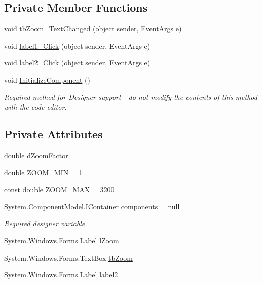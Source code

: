 \subsection*{Private Member Functions}
\begin{DoxyCompactItemize}
\item 
void \mbox{\hyperlink{class_paint___program_1_1_zoom_control_a1ee526663282fdc5eef952188eba387b}{tb\+Zoom\+\_\+\+Text\+Changed}} (object sender, Event\+Args e)
\item 
void \mbox{\hyperlink{class_paint___program_1_1_zoom_control_a6d2fce455e1f5e4274e5298c3157de5d}{label1\+\_\+\+Click}} (object sender, Event\+Args e)
\item 
void \mbox{\hyperlink{class_paint___program_1_1_zoom_control_a8269532cbb9e59c04a61561c4ae1ebe3}{label2\+\_\+\+Click}} (object sender, Event\+Args e)
\item 
void \mbox{\hyperlink{class_paint___program_1_1_zoom_control_ae61acf927bdaa41820d5ee2c8b5c05c4}{Initialize\+Component}} ()
\begin{DoxyCompactList}\small\item\em Required method for Designer support -\/ do not modify the contents of this method with the code editor. \end{DoxyCompactList}\end{DoxyCompactItemize}
\subsection*{Private Attributes}
\begin{DoxyCompactItemize}
\item 
double \mbox{\hyperlink{class_paint___program_1_1_zoom_control_a929f4269dd2e850603888768d8f83753}{d\+Zoom\+Factor}}
\item 
double \mbox{\hyperlink{class_paint___program_1_1_zoom_control_a615b9941df411c331af5041d38da6ad2}{Z\+O\+O\+M\+\_\+\+M\+IN}} = 1
\item 
const double \mbox{\hyperlink{class_paint___program_1_1_zoom_control_a81f7435ed0a733d8c3fd4d86f5c8e6b2}{Z\+O\+O\+M\+\_\+\+M\+AX}} = 3200
\item 
System.\+Component\+Model.\+I\+Container \mbox{\hyperlink{class_paint___program_1_1_zoom_control_a0c11233497665c39609e490beca6eaf2}{components}} = null
\begin{DoxyCompactList}\small\item\em Required designer variable. \end{DoxyCompactList}\item 
System.\+Windows.\+Forms.\+Label \mbox{\hyperlink{class_paint___program_1_1_zoom_control_af9e86cbd2b21cf273f9c88ca3535cd2e}{l\+Zoom}}
\item 
System.\+Windows.\+Forms.\+Text\+Box \mbox{\hyperlink{class_paint___program_1_1_zoom_control_a1417125b06048606d4075c2f483aea72}{tb\+Zoom}}
\item 
System.\+Windows.\+Forms.\+Label \mbox{\hyperlink{class_paint___program_1_1_zoom_control_ad2e73a7d0623eda78f4483d940f57ed6}{label2}}
\end{DoxyCompactItemize}


